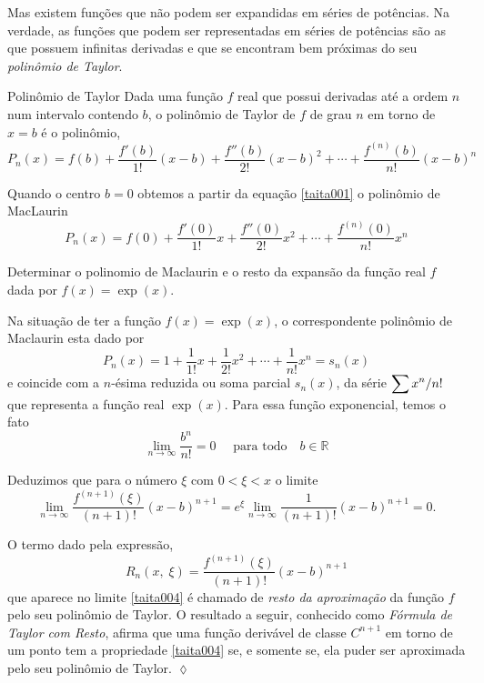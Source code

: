Mas existem funções que não podem ser expandidas em séries de potências. Na verdade, as funções que
 podem ser representadas em séries de potências são as que possuem infinitas derivadas e que se 
 encontram bem próximas do seu \emph{polinômio de Taylor}.

\begin{defic}{Polinômio de Taylor}{}
Dada uma função $f$ real que possui derivadas até a ordem $n$ num intervalo contendo $b$, o polinômio de 
Taylor de $f$ de grau $n$ em torno de $x=b$ é o polinômio,
\begin{equation}\label{taita001}
P_n(x)=f(b)+\frac{f'(b)}{1!}(x-b)+\frac{f''(b)}{2!}(x-b)^2+\cdots+\frac{f^{(n)}(b)}{n!}(x-b)^n
\end{equation}
\end{defic}

Quando o centro $b=0$ obtemos a partir da equação \eqref{taita001} o polinômio de MacLaurin
\begin{equation}\label{taita002}
P_n(x)=f(0)+\frac{f'(0)}{1!}x+\frac{f''(0)}{2!}x^2+\cdots+\frac{f^{(n)}(0)}{n!}x^{n}
\end{equation}

\begin{exer}
Determinar o polinomio de Maclaurin e o resto da expansão da função real \(f\) dada por  \(f(x)=\exp(x)\).
\end{exer}

\solo
Na situação de ter a função $f(x)=\exp(x)$, o correspondente polinômio de Maclaurin esta dado por
\begin{equation}\label{taita003}
P_n(x)=1+\dfrac{1}{1!}x+\dfrac{1}{2!}x^2+\cdots+\dfrac{1}{n!}x^{n}=s_{n}(x)
\end{equation}
e coincide com a $n$-ésima reduzida ou soma parcial \(s_{n}(x)\), da série $\displaystyle{\sum x^n/n!}$ que representa a 
função real $\exp(x)$. Para essa função exponencial, temos o fato
\begin{equation*}
  \lim_{n \to \infty}\frac{b^n}{n!} = 0 \quad \text{ para todo} \quad b \in \mathbb{R}
\end{equation*}

Deduzimos que para o número $\xi$ com $0<\xi <x$ o limite
\begin{equation}\label{taita004}
\lim_{n \to \infty} \frac{f^{(n+1)}(\xi)}{(n+1)!}(x-b)^{n+1}=e^{\xi}\lim_{n \to \infty} 
\dfrac{1}{(n+1)!}(x-b)^{n+1}=0.
\end{equation}

O termo dado pela expressão,
\begin{equation*}
  R_n(x,\;\xi)=\frac{f^{(n+1)}(\xi)}{(n+1)!}(x-b)^{n+1}
\end{equation*}
que aparece no limite \eqref{taita004} é chamado de \emph{resto da aproximação} da função $f$ pelo 
seu polinômio de Taylor. O resultado a seguir, conhecido como \emph{Fórmula de Taylor com Resto}, afirma
 que uma função derivável de classe $C^{n+1}$ em torno de um ponto tem a propriedade \eqref{taita004} se, 
 e somente se, ela puder ser aproximada pelo seu polinômio de Taylor. \hfill \(\lozenge\)



